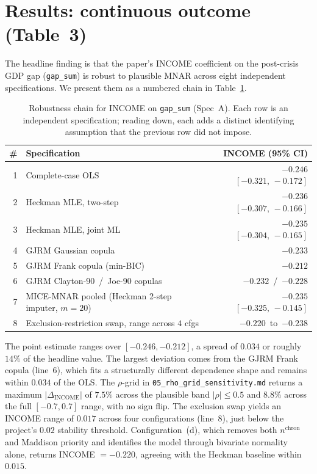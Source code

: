 \documentclass[11pt]{article}
\begin{document}
\section{Results: continuous outcome (Table~3)}\label{sec:cont}

The headline finding is that the paper's INCOME coefficient on the
post-crisis GDP gap (\texttt{gap\_sum}) is robust to plausible MNAR
across eight independent specifications. We present them as a numbered
chain in Table~\ref{tab:chain}.

\begin{table}[h]
\centering
\caption{Robustness chain for INCOME on \texttt{gap\_sum} (Spec~A).
Each row is an independent specification; reading down, each adds a
distinct identifying assumption that the previous row did not impose.}
\label{tab:chain}
\begin{tabular}{rlr}
\toprule
\# & Specification & INCOME (95\% CI) \\
\midrule
1 & Complete-case OLS                                & $-0.246$ \quad $[-0.321,\,-0.172]$ \\
2 & Heckman MLE, two-step                            & $-0.236$ \quad $[-0.307,\,-0.166]$ \\
3 & Heckman MLE, joint ML                            & $-0.235$ \quad $[-0.304,\,-0.165]$ \\
4 & GJRM Gaussian copula                             & $-0.233$ \\
5 & GJRM Frank copula (min-BIC)                      & $-0.212$ \\
6 & GJRM Clayton-90 \,/\, Joe-90 copulas             & $-0.232$ \,/\, $-0.228$ \\
7 & MICE-MNAR pooled (Heckman 2-step imputer, $m = 20$) & $-0.235$ \quad $[-0.325,\,-0.145]$ \\
8 & Exclusion-restriction swap, range across $4$ cfgs & $-0.220$ \,to\, $-0.238$ \\
\bottomrule
\end{tabular}
\end{table}

The point estimate ranges over $[-0.246, -0.212]$, a spread of $0.034$
or roughly $14\%$ of the headline value. The largest deviation comes
from the GJRM Frank copula (line~6), which fits a structurally
different dependence shape and remains within $0.034$ of the OLS. The
$\rho$-grid in
\texttt{05\_rho\_grid\_sensitivity.md} returns a maximum
$|\Delta_{\text{INCOME}}|$ of $7.5\%$ across the plausible band
$|\rho| \le 0.5$ and $8.8\%$ across the full $[-0.7, 0.7]$ range, with
no sign flip. The exclusion swap yields an INCOME range of $0.017$
across four configurations (line~8), just below the project's $0.02$
stability threshold. Configuration~(d), which removes both
$n^{\text{chron}}$ and Maddison priority and identifies the model
through bivariate normality alone, returns INCOME $= -0.220$, agreeing
with the Heckman baseline within $0.015$.
\end{document}
